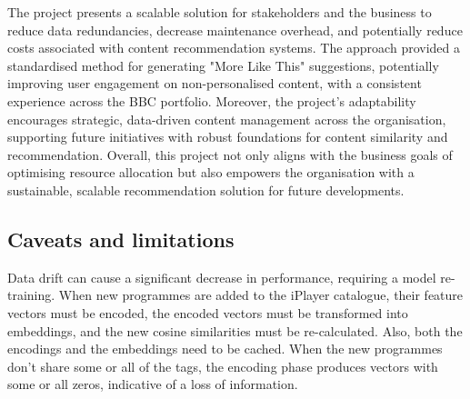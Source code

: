 The project presents a scalable solution for stakeholders and the business to reduce data redundancies,
decrease maintenance overhead, and potentially reduce costs associated with content recommendation systems.
The approach provided a standardised method for generating "More Like This" suggestions,
potentially improving user engagement on non-personalised content,
with a consistent experience across the BBC portfolio.
Moreover, the project's adaptability encourages strategic, data-driven content management across the organisation,
supporting future initiatives with robust foundations for content similarity and recommendation.
Overall, this project not only aligns with the business goals of optimising resource allocation but also empowers the organisation with a sustainable,
scalable recommendation solution for future developments.

\subsection{Caveats and limitations}

Data drift can cause a significant decrease in performance, requiring a model re-training.
When new programmes are added to the iPlayer catalogue, their feature vectors must be encoded,
the encoded vectors must be transformed into embeddings, and the new cosine similarities must be re-calculated.
Also, both the encodings and the embeddings need to be cached.
When the new programmes don't share some or all of the tags, the encoding phase produces vectors with some or all zeros,
indicative of a loss of information.
